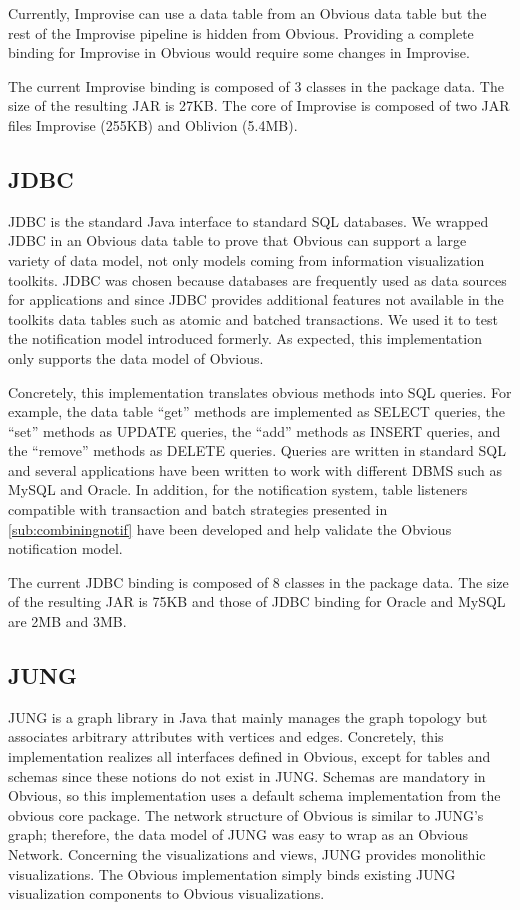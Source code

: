 Currently, Improvise can use a data table from an Obvious data table
but the rest of the Improvise pipeline is hidden from
Obvious. Providing a complete binding for Improvise in Obvious would
require some changes in Improvise.

The current Improvise binding is composed of 3 classes in the package
data. The size of the resulting JAR is 27KB. The core of Improvise is
composed of two JAR files Improvise (255KB) and Oblivion (5.4MB). 

\subsection{JDBC}

JDBC is the standard Java interface to standard SQL databases.  We
wrapped JDBC in an Obvious data table to prove that Obvious can
support a large variety of data model, not only models coming from
information visualization toolkits.  JDBC was chosen because databases
are frequently used as data sources for applications and since JDBC
provides additional features not available in the toolkits data tables
such as atomic and batched transactions.  We used it to test the
notification model introduced formerly.  As expected, this
implementation only supports the data model of Obvious.

Concretely, this implementation translates obvious methods into SQL
queries.  For example, the data table ``get'' methods are implemented
as SELECT queries, the ``set'' methods as UPDATE queries, the ``add''
methods as INSERT queries, and the ``remove'' methods as DELETE
queries.  Queries are written in standard SQL and several applications
have been written to work with different DBMS such as MySQL and
Oracle.  In addition, for the notification system, table listeners
compatible with transaction and batch strategies presented in
\ref{sub:combiningnotif} have been developed and help validate the
Obvious notification model.

The current JDBC binding is composed of 8 classes in the package data.
The size of the resulting JAR is 75KB and those of JDBC binding for Oracle
and MySQL are 2MB and 3MB.

\subsection{JUNG}

JUNG is a graph library in Java that mainly manages the graph topology
but associates arbitrary attributes with vertices and edges.
Concretely, this implementation realizes all interfaces defined in
Obvious, except for tables and schemas since these notions do not
exist in JUNG.  Schemas are mandatory in Obvious, so this
implementation uses a default schema implementation from the obvious
core package.  The network structure of Obvious is similar to JUNG's
graph; therefore, the data model of JUNG was easy to wrap as an
Obvious Network.  Concerning the visualizations and views, JUNG
provides monolithic visualizations.  The Obvious implementation simply
binds existing JUNG visualization components to Obvious visualizations.


